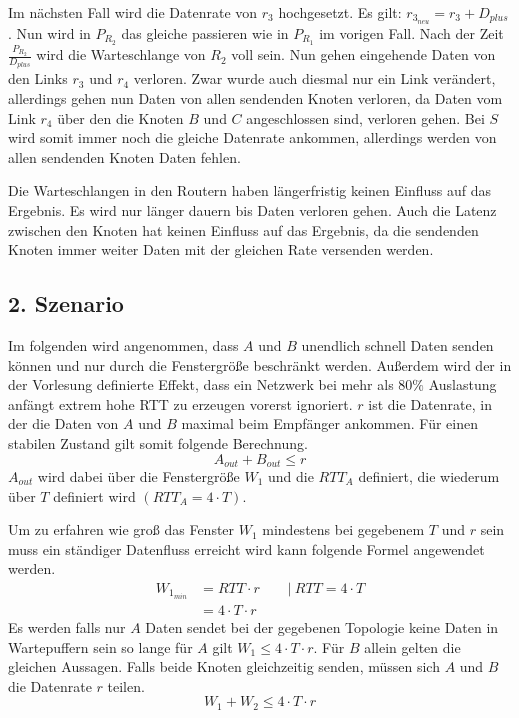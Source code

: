 \documentclass [10pt,a4paper]{article}
\begin{document}
		Im nächsten Fall wird die Datenrate von $r_3$ hochgesetzt. Es gilt: $r_{3_{neu}}=r_3+D_{plus}$. Nun wird in $P_{R_2}$ das gleiche passieren wie in $P_{R_1}$ im vorigen Fall. Nach der Zeit $\frac{P_{R_2}}{D_{plus}}$ wird die Warteschlange von $R_2$ voll sein. Nun gehen eingehende Daten von den Links $r_3$ und $r_4$ verloren. Zwar wurde auch diesmal nur ein Link verändert, allerdings gehen nun Daten von allen sendenden Knoten verloren, da Daten vom Link $r_4$ über den die Knoten $B$ und $C$ angeschlossen sind, verloren gehen. Bei $S$ wird somit immer noch die gleiche Datenrate ankommen, allerdings werden von allen sendenden Knoten Daten fehlen.
		
		Die Warteschlangen in den Routern haben längerfristig keinen Einfluss auf das Ergebnis. Es wird nur länger dauern bis Daten verloren gehen. Auch die Latenz zwischen den Knoten hat keinen Einfluss auf das Ergebnis, da die sendenden Knoten immer weiter Daten mit der gleichen Rate versenden werden.
		
	\subsection{2. Szenario}
	\label{2-szen-analytisch}
		Im folgenden wird angenommen, dass $A$ und $B$ unendlich schnell Daten senden können und nur durch die Fenstergröße beschränkt werden. Außerdem wird der in der Vorlesung definierte Effekt, dass ein Netzwerk bei mehr als $80\%$ Auslastung anfängt extrem hohe RTT zu erzeugen vorerst ignoriert. $r$ ist die Datenrate, in der die Daten von $A$ und $B$ maximal beim Empfänger ankommen. Für einen stabilen Zustand gilt somit folgende Berechnung.
		\[A_{out}+B_{out}\leq r\]
		$A_{out}$ wird dabei über die Fenstergröße $W_1$ und die $RTT_A$ definiert, die wiederum über $T$ definiert wird $(RTT_A=4\cdot T)$.
		
		Um zu erfahren wie groß das Fenster $W_1$ mindestens bei gegebenem $T$ und $r$ sein muss ein ständiger Datenfluss erreicht wird kann folgende Formel angewendet werden.
		\begin{align*}
			W_{1_{min}} &= RTT\cdot r\qquad | \ RTT=4\cdot T \\
			&= 4\cdot T\cdot r
		\end{align*}
		Es werden falls nur $A$ Daten sendet bei der gegebenen Topologie keine Daten in Wartepuffern sein so lange für $A$ gilt $W_1\leq 4\cdot T\cdot r$. Für $B$ allein gelten die gleichen Aussagen. Falls beide Knoten gleichzeitig senden, müssen sich $A$ und $B$ die Datenrate $r$ teilen.
		\[W_1+W_2\leq 4\cdot T\cdot r \]
		
\end{document}
